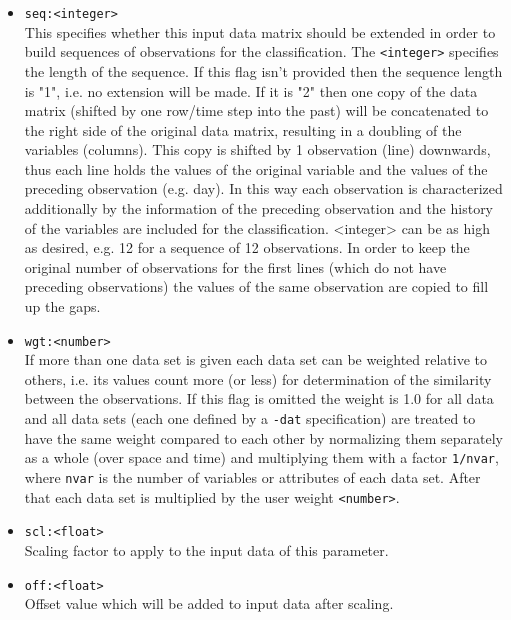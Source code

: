 \documentclass[12pt, oneside, a4paper, headsepline, plainheadsepline]{scrbook}
\begin{document}
\begin{itemize}
\item \verb+seq:<integer>+ \\
        This specifies whether this input data matrix should be
        extended in order to build sequences of observations for
        the classification. The \verb+<integer>+ specifies the length of
        the sequence. If this flag isn't provided then the sequence
        length is "1", i.e. no extension will be made. If it is "2" then
        one copy of the data matrix (shifted by one row/time step into the past) 
        will be concatenated to the right
        side of the original data matrix, resulting in a doubling of the
        variables (columns). This copy is shifted by 1 observation (line)
        downwards, thus each line holds the values of the original variable
        and the values of the preceding observation (e.g. day). In this
        way each observation is characterized additionally by the
        information of the preceding observation and the history of the
        variables are included for the classification. <integer> can be as
        high as desired, e.g. 12 for a sequence of 12 observations.
        In order to keep the original number of observations for the first
        lines (which do not have preceding observations) the values of
        the same observation are copied to fill up the gaps.

\item \verb+wgt:<number>+ \\
        If more than one data set is given each data set can be weighted
        relative to others, i.e. its values count more (or less) for
        determination of the similarity between the observations.
        If this flag is omitted the weight is 1.0 for all data and
        all data sets (each one defined by a \verb+-dat+ specification)
        are treated to have the same weight compared to each other by
        normalizing them separately as a whole (over space and time) 
        and multiplying them with a factor \verb+1/nvar+, where \verb+nvar+ is the 
        number of variables or attributes of each data set. 
		After that each data set is multiplied by the user weight \verb+<number>+. 

\item \verb+scl:<float>+ \\
		Scaling factor to apply to the input data of this parameter.

\item \verb+off:<float>+ \\
		Offset value which will be added to input data after scaling.


\end{itemize}
\end{document}
